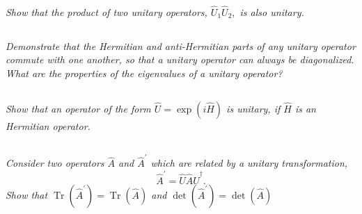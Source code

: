 \documentclass[12pt, letterpaper]{article}
\begin{document}
\subsection{}
\textit{Show that the product of two unitary operators, $\hat{U}_{1} \hat{U}_{2},$ is also unitary.}
\subsection{}
\textit{Demonstrate that the Hermitian and anti-Hermitian parts of any unitary operator commute with one another, so that a unitary operator can always be diagonalized. What are the properties of the eigenvalues of a unitary operator?}
\subsection{}
\textit{Show that an operator of the form $\hat{U}=\exp (i \hat{H})$ is unitary, if $\hat{H}$ is an Hermitian operator.}
\subsection{}
\textit{Consider two operators $\hat{A}$ and $\hat{A}^{\prime}$ which are related by a unitary transformation,} 
$$
\hat{A}^{\prime}=\hat{U} \hat{A} \hat{U}^{\dagger}.
$$
\textit{Show that $\operatorname{Tr}\left(\hat{A}^{\prime}\right)=\operatorname{Tr}(\hat{A})$ and $\operatorname{det}\left(\hat{A}^{\prime}\right)=\operatorname{det}(\hat{A})$}
\end{document}
